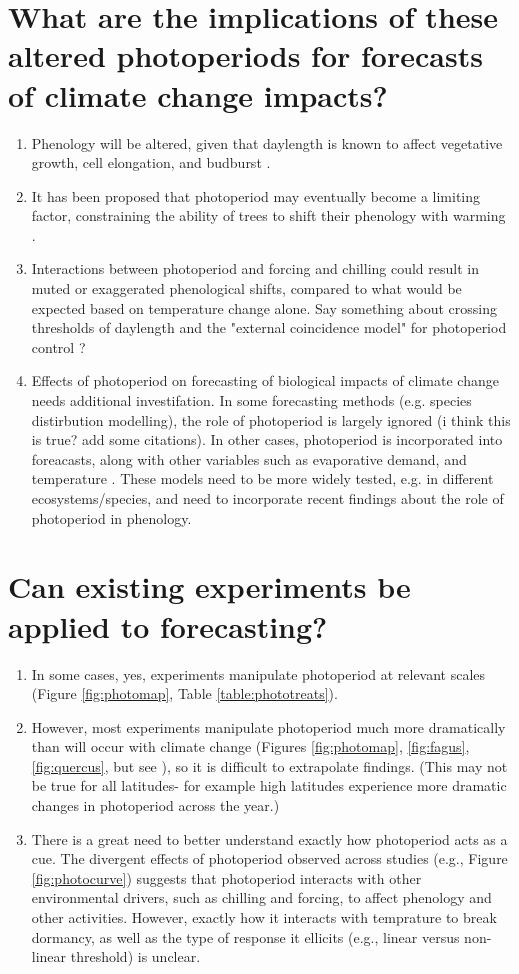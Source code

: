 \documentclass{article}
\begin{document}
\section*{What are the implications of these altered photoperiods for forecasts of climate change impacts?}
\begin{enumerate}
\item Phenology will be altered, given that daylength is known to affect vegetative growth, cell elongation, and budburst \citep{Linkosalo:2006aa,erwin1998,sidaway2010, Hsu:2011}.
\item It has been proposed that photoperiod may eventually become a limiting factor, constraining the ability of trees to shift their phenology with warming \citep{koerner2010b,vitasse2013, Morin:2010aa}. 
\item Interactions between photoperiod and forcing and chilling could result in muted or exaggerated phenological shifts, compared to what would be expected based on temperature change alone. Say something about crossing thresholds of daylength and the "external coincidence model" for photoperiod control \citep{bastow2002,kobayashi2007,andres2012,Singh:2017}?
\item Effects of photoperiod on forecasting of biological impacts of climate change needs additional investifation. In some forecasting methods (e.g. species distirbution modelling), the role of photoperiod is largely ignored (i think this is true? add some citations). In other cases, photoperiod is incorporated into foreacasts, along with other variables such as evaporative demand, and temperature \citep [e.g. ED] []{jolly2005, medvigy2013}. These models need to be more widely tested, e.g. in different ecosystems/species, and need to incorporate recent findings about the role of photoperiod in phenology.     
\end{enumerate}
\section*{Can existing experiments be applied to forecasting?}
\begin{enumerate}
\item In some cases, yes, experiments manipulate photoperiod at relevant scales (Figure \ref{fig:photomap}, Table \ref{table:phototreats}).
\item However, most experiments manipulate photoperiod much more dramatically than will occur with climate change (Figures \ref{fig:photomap}, \ref{fig:fagus},\ref{fig:quercus}, but see \citep{Basler:2012}), so it is difficult to extrapolate findings. (This may not be true for all latitudes- for example high latitudes experience more dramatic changes in photoperiod across the year.)
\item There is a great need to better understand exactly how photoperiod acts as a cue. The divergent effects of photoperiod observed across studies (e.g., Figure \ref{fig:photocurve}) suggests that photoperiod interacts with other environmental drivers, such as chilling and forcing, to affect phenology and other activities. However, exactly how it interacts with temprature to break dormancy, as well as the type of response it ellicits (e.g., linear versus non-linear threshold) is unclear. 
\end{enumerate}
\end{document}
